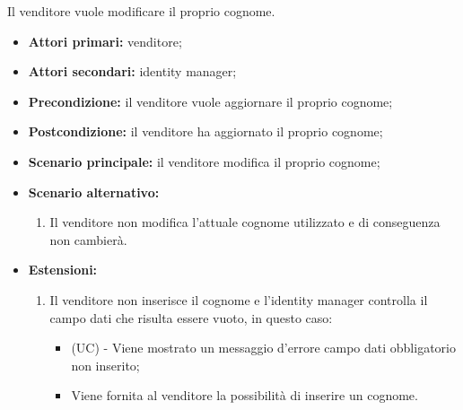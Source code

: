 Il venditore vuole modificare il proprio cognome.
\begin{itemize}
	\item \textbf{Attori primari:} venditore;
	\item \textbf{Attori secondari:} identity manager;
	\item \textbf{Precondizione:} il venditore vuole aggiornare il proprio cognome;
	\item \textbf{Postcondizione:} il venditore ha aggiornato il proprio cognome;
	\item \textbf{Scenario principale:} il venditore modifica il proprio cognome;
	\item \textbf{Scenario alternativo:}
	\begin{enumerate}[label=\lett]
		\item Il venditore non modifica l'attuale cognome utilizzato e di conseguenza non cambierà.
	\end{enumerate}
	\item \textbf{Estensioni:}
	\begin{enumerate}[label=\lett]
		\item Il venditore non inserisce il cognome e l'identity manager controlla il campo dati che risulta essere vuoto, in questo caso:
		\begin{itemize}
			\item (UC) - Viene mostrato un messaggio d'errore campo dati obbligatorio non inserito;
			\item Viene fornita al venditore la possibilità di inserire un cognome.
		\end{itemize}
	\end{enumerate} 
\end{itemize}

